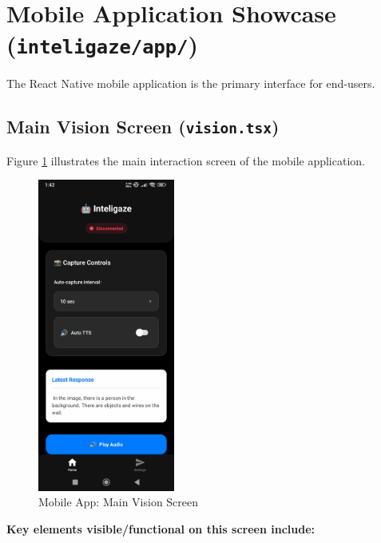 \documentclass[12pt, a4paper]{report}
\begin{document}
\section{Mobile Application Showcase (\texttt{inteligaze/app/})}
The React Native mobile application is the primary interface for end-users.
\subsection{Main Vision Screen (\texttt{vision.tsx})}
Figure \ref{fig:mobile_vision_screen} illustrates the main interaction screen of the mobile application.
\begin{figure}[H]
    \centering
    \includegraphics[width=0.4\textwidth]{fig/mobile_vision_main.jpg}
    \caption{Mobile App: Main Vision Screen}
    \label{fig:mobile_vision_screen}
\end{figure}
\textbf{Key elements visible/functional on this screen include:}
\end{document}

